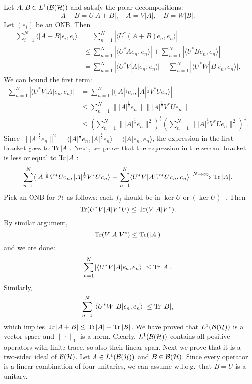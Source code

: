 \begin{myproof}
  Let $A, B \in L^1 (\operatorname{\mathcal{B} (\mathcal{H})})$ and satisfy the polar decompositions:
  $$A + B = U |A + B|,\quad A = V |A|,\quad B = W |B|.$$
  Let $(e_i)$ be an ONB. Then 
  \begin{align*}
    \sum_{i = 1} ^N \langle |A + B| e_i, e_i \rangle &= \sum_{n = 1} ^N |\langle U^* (A + B) e_n, e_n\rangle|\\
    &\leq \sum_{n = 1} ^N |\langle U^* A e_n, e_n \rangle| + \sum_{n = 1} ^N |\langle U^* B e_n, e_n \rangle| \\
    &= \sum_{n = 1} ^N |\langle U^* V |A| e_n, e_n \rangle| + \sum_{n = 1} ^N |\langle U^*W |B| e_n, e_n \rangle|.
  \end{align*}
  We can bound the first term:
  \begin{align*}
    \sum_{n = 1} ^N |\langle U^* V |A| e_n, e_n \rangle| &= \sum_{n = 1} ^N |\langle |A|^{\frac{1}{2}} e_n, |A|^{\frac{1}{2}} V^* U e_n \rangle|\\
    &\leq \sum_{n = 1} ^N \||A|^{\frac{1}{2}} e_n\| \||A|^{\frac{1}{2}} V^* U e_n\|\\
    &\leq \left(\sum_{n = 1} ^N \||A|^{\frac{1}{2}} e_n\|^2 \right)^{\frac{1}{2}} \left(\sum_{n = 1} ^N \||A|^{\frac{1}{2}} V^* U e_n\|^2\right)^{\frac{1}{2}}.
  \end{align*}
  Since $\| |A|^{\frac{1}{2}} e_n \|^2 = \langle |A|^{\frac{1}{2}} e_n, |A|^{\frac{1}{2}} e_n \rangle = \langle |A| e_n, e_n\rangle$, the expression in the first bracket goes to $\operatorname{Tr} |A|$.
  Next, we prove that the expression in the second bracket is less or equal to $\operatorname{Tr} |A|$:
  $$\sum_{n = 1} ^N \langle |A|^{\frac{1}{2}} V^* U e_n, |A|^{\frac{1}{2}} V^* U e_n \rangle = \sum_{n = 1} ^N \langle U^* V |A| V^* U e_n, e_n \rangle \xrightarrow{N \to \infty} \operatorname{Tr} |A|.$$
  Pick an ONB for $\mathcal{H}$ as follows: each $f_j$ should be in $\ker U$ or $(\ker U)^\perp$.
  Then $$\operatorname{Tr} (U^* V |A| V^* U) \leq \operatorname{Tr} (V |A| V^*).$$
  By similar argument, 
  $$\operatorname{Tr} (V |A| V^*) \leq \operatorname{Tr}(|A|)$$
  and we are done:
  $$\sum_{n = 1} ^N |\langle U^* V |A| e_n, e_n \rangle| \leq \operatorname{Tr} |A|.$$
  Similarly, 
  $$\sum_{n = 1} ^N |\langle U^* W |B| e_n, e_n \rangle| \leq \operatorname{Tr} |B|,$$
  which implies 
  $\operatorname{Tr} |A + B| \leq \operatorname{Tr} |A| + \operatorname{Tr} |B|$.
  We have proved that $L^1 (\operatorname{\mathcal{B} (\mathcal{H})})$ is a vector space and $\| \cdot \|_1$ is a norm.
  Clearly, $L^1 (\operatorname{\mathcal{B} (\mathcal{H})})$ contains all positive operators with finite trace,
  so also their linear span. Next we prove that it is a two-sided ideal of $\operatorname{\mathcal{B} (\mathcal{H})}$.
  Let $A \in L^1 (\operatorname{\mathcal{B} (\mathcal{H})})$ and $B \in \operatorname{\mathcal{B} (\mathcal{H})}$.
  Since every operator is a linear combination of four unitaries, we can assume w.l.o.g.~that $B = U$ is a unitary.

\end{myproof}

